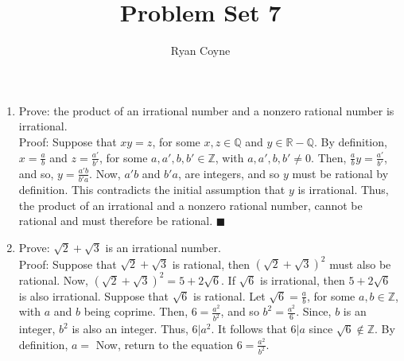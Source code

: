 \documentclass[12pt]{article}
\newcommand{\Z}{\mathbb{Z}}
\newcommand{\R}{\mathbb{R}}
\newcommand{\Q}{\mathbb{Q}}
\newcommand{\qed}{\(\blacksquare\)}
\begin{document}
    \title{Problem Set 7}
    \author{Ryan Coyne}
    \maketitle

    \begin{enumerate}
        \item Prove: the product of an irrational number and a nonzero rational number is irrational.\\ Proof: Suppose that \(xy=z\), for some \(x,z\in\Q\) and \(y\in\R-\Q\). By definition, \(x=\frac{a}{b}\) and \(z=\frac{a'}{b'}\), for some \(a,a',b,b'\in\Z\), with \(a,a',b,b'\neq0\). Then, \(\frac{a}{b}y=\frac{a'}{b'}\), and so, \(y=\frac{a'b}{b'a}\). Now, \(a'b\) and \(b'a\), are integers, and so \(y\) must be rational by definition. This contradicts the initial assumption that \(y\) is irrational. Thus, the product of an irrational and a nonzero rational number, cannot be rational and must therefore be rational. \qed
        \item Prove:  \(\sqrt{2}+\sqrt{3}\) is an irrational number.\\ Proof: Suppose that \(\sqrt{2}+\sqrt{3}\) is rational, then \((\sqrt{2}+\sqrt{3})^2\) must also be rational. Now, \((\sqrt{2}+\sqrt{3})^2=5+2\sqrt{6}\). If \(\sqrt{6}\) is irrational, then \(5+2\sqrt{6}\) is also irrational. Suppose that \(\sqrt{6}\) is rational. Let \(\sqrt{6}=\frac{a}{b}\), for some \(a,b\in\Z\), with \(a\) and \(b\) being coprime. Then, \(6=\frac{a^2}{b^2}\), and so \(b^2=\frac{a^2}{6}\). Since, \(b\) is an integer, \(b^2\) is also an integer. Thus, \(6|a^2\). It follows that \(6|a\) since \(\sqrt{6}\not\in\Z\). By definition, \(a=\) Now, return to the equation \(6=\frac{a^2}{b^2}\). 
    \end{enumerate}
\end{document}

